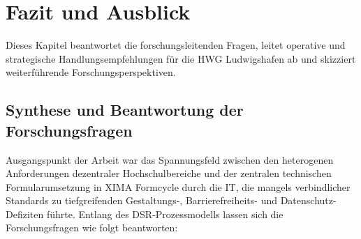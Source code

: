 \chapter{Fazit und Ausblick}
\label{chap:fazit}

Dieses Kapitel beantwortet die forschungsleitenden Fragen, leitet operative und strategische Handlungsempfehlungen für die HWG Ludwigshafen ab und skizziert weiterführende Forschungsperspektiven.

\section{Synthese und Beantwortung der Forschungsfragen}
\label{sec:fazit_ergebnisse}

Ausgangspunkt der Arbeit war das Spannungsfeld zwischen den heterogenen Anforderungen dezentraler Hochschulbereiche und der zentralen technischen Formularumsetzung in XIMA Formcycle durch die IT, die mangels verbindlicher Standards zu tiefgreifenden Gestaltungs-, Barrierefreiheits- und Datenschutz-Defiziten führte. Entlang des DSR-Prozessmodells \parencite{peffers2007design} lassen sich die Forschungsfragen wie folgt beantworten:
